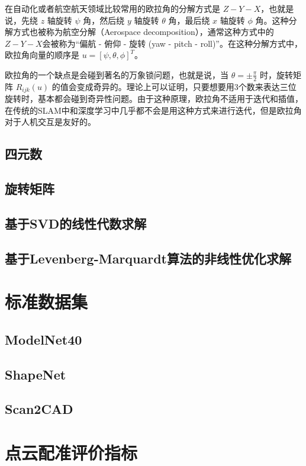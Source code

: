 在自动化或者航空航天领域比较常用的欧拉角的分解方式是 $Z-Y-X$，也就是说，先绕 $z$ 轴旋转 $\psi$ 角，然后绕 $y$ 轴旋转 $\theta$ 角，最后绕 $x$ 轴旋转 $\phi$ 角。这种分解方式也被称为航空分解（Aerospace decomposition），通常这种方式中的$Z-Y-X$会被称为“偏航 - 俯仰 - 旋转 (yaw - pitch - roll)”。在这种分解方式中，欧拉角向量的顺序是 $u = [\psi, \theta, \phi]^T$。

欧拉角的一个缺点是会碰到著名的万象锁问题\cite{vsenk2006rotation}，也就是说，当 $\theta = \pm \frac{\pi}{2}$ 时，旋转矩阵 $R_{ijk}(u)$ 的值会变成奇异的。理论上可以证明，只要想要用3个数来表达三位旋转时，基本都会碰到奇异性问题\cite{stuelpnagel1964parametrization}。由于这种原理，欧拉角不适用于迭代和插值，在传统的SLAM中和深度学习中几乎都不会是用这种方式来进行迭代，但是欧拉角对于人机交互是友好的。

\subsection{四元数}

\subsection{旋转矩阵}


\subsection{基于SVD的线性代数求解}
\subsection{基于Levenberg-Marquardt算法的非线性优化求解}

\section{标准数据集}
\subsection{ModelNet40}
\subsection{ShapeNet}
\subsection{Scan2CAD}

\section{点云配准评价指标}
